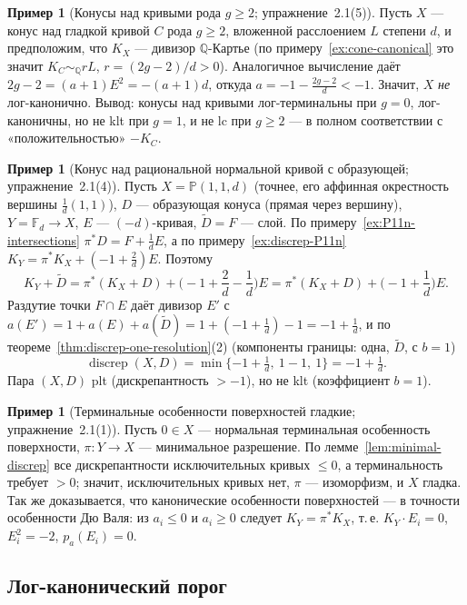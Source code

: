 \documentclass[11pt,a4paper]{article}
\theoremstyle{plain}
\theoremstyle{definition}
\newtheorem{example}[theorem]{Пример}
\theoremstyle{remark}
\newcommand{\Q}{\mathbb{Q}}
\newcommand{\PP}{\mathbb{P}}
\DeclareMathOperator{\discrep}{discrep}
\begin{document}
\begin{example}[Конусы над кривыми рода $g\ge2$; упражнение~2.1(5)]
Пусть $X$ --- конус над гладкой кривой $C$ рода $g\ge2$, вложенной расслоением $L$ степени $d$,
и предположим, что $K_X$ --- дивизор $\Q$-Картье (по примеру~\ref{ex:cone-canonical} это значит
$K_C\sim_\Q rL$, $r=(2g-2)/d>0$). Аналогичное вычисление даёт $2g-2=(a+1)E^2=-(a+1)d$, откуда
$a=-1-\frac{2g-2}d<-1$. Значит, $X$ \emph{не} лог-канонично. Вывод: конусы над кривыми
лог-терминальны при $g=0$, лог-каноничны, но не klt при $g=1$, и не lc при $g\ge2$ --- в полном
соответствии с «положительностью» $-K_C$.
\end{example}

\begin{example}[Конус над рациональной нормальной кривой с образующей; упражнение~2.1(4)]
Пусть $X=\PP(1,1,d)$ (точнее, его аффинная окрестность вершины $\frac1d(1,1)$), $D$ ---
образующая конуса (прямая через вершину), $Y=\mathbb F_d\to X$, $E$ --- $(-d)$-кривая,
$\tilde D=F$ --- слой. По примеру~\ref{ex:P11n-intersections} $\pi^*D=F+\frac1dE$, а по
примеру~\ref{ex:discrep-P11n} $K_Y=\pi^*K_X+(-1+\frac2d)E$. Поэтому
\[
K_Y+\tilde D=\pi^*(K_X+D)+\Big(-1+\frac2d-\frac1d\Big)E=\pi^*(K_X+D)+\Big(-1+\frac1d\Big)E .
\]
Раздутие точки $F\cap E$ даёт дивизор $E'$ с $a(E')=1+a(E)+a(\tilde D)=1+(-1+\frac1d)-1=-1+\frac1d$,
и по теореме~\ref{thm:discrep-one-resolution}(2) (компоненты границы: одна, $\tilde D$, с $b=1$)
\[
\discrep(X,D)=\min\{-1+\tfrac1d,\ 1-1,\ 1\}=-1+\tfrac1d .
\]
Пара $(X,D)$ plt (дискрепантность $>-1$), но не klt (коэффициент $b=1$).
\end{example}

\begin{example}[Терминальные особенности поверхностей гладкие; упражнение~2.1(1)]\label{ex:terminal-smooth}
Пусть $0\in X$ --- нормальная терминальная особенность поверхности, $\pi\colon Y\to X$ ---
минимальное разрешение. По лемме~\ref{lem:minimal-discrep} все дискрепантности исключительных
кривых $\le0$, а терминальность требует $>0$; значит, исключительных кривых нет, $\pi$ ---
изоморфизм, и $X$ гладка. Так же доказывается, что канонические особенности поверхностей ---
в точности особенности Дю Валя: из $a_i\le0$ и $a_i\ge0$ следует $K_Y=\pi^*K_X$, т.\,е. $K_Y\cdot E_i=0$,
$E_i^2=-2$, $p_a(E_i)=0$.
\end{example}

\subsection{Лог-канонический порог}
\end{document}
